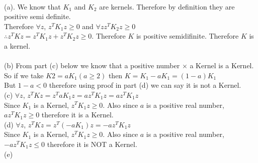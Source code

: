 \begin{answer}\\
(a). We know that $K_1$ and $K_2$ are kernels. Therefore by definition they are positive semi definite.\\
Therefore $\forall z$, $z^TK_1z \geq 0$ and $\forall z z^TK_2z \geq 0$\\
$\therefore z^TKz = z^TK_1z+z^TK_2z \geq 0$. Therefore $K$ is positive semidifinite. Therefore $K$ is a kernel.\\
\\
(b) From part (c) below we know that a positive number $\times$ a Kernel is a Kernel. So if we take $K2=aK_1 (a \geq 2)$ then $K=K_1-aK_1=(1-a)K_1$\\
But $1-a <0$ therefore using proof in part (d) we can say it is not a Kernel.\\
(c) $\forall z$, $z^TKz=z^TaK_1z=az^TK_1z=az^TK_1z$\\
Since $K_1$ is a Kernel, $z^TK_1z \geq 0$. Also since $a$ is a positive real number, $az^TK_1z \geq 0$ therefore it is a Kernel.\\
(d) $\forall z$, $z^TKz=z^T(-aK_1)z=-az^TK_1z$\\
Since $K_1$ is a Kernel, $z^TK_1z \geq 0$. Also since $a$ is a positive real number, $-az^TK_1z \leq 0$ therefore it is NOT a Kernel.\\
(e) 
\end{answer}